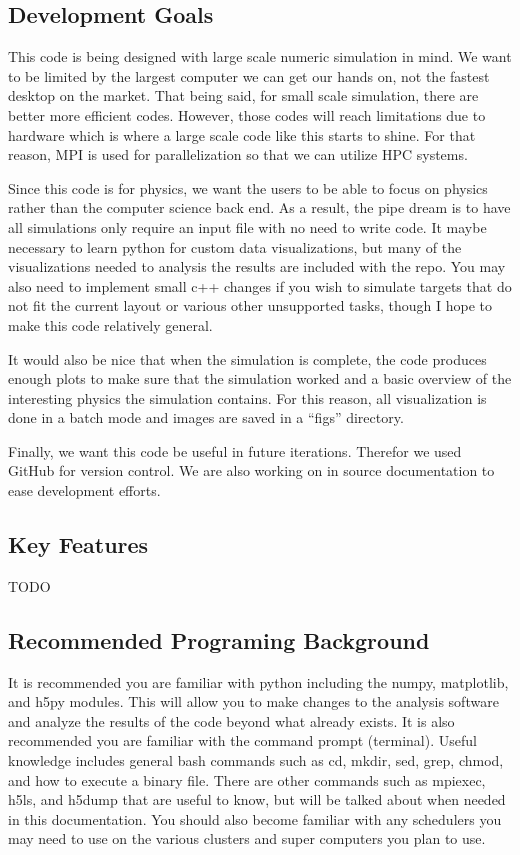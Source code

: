 \documentclass{article}
\begin{document}
\subsection{Development Goals} %
\label{sub:development_goals}
This code is being designed with large scale numeric simulation in mind. We want to be limited by the largest computer we can get our hands on, not the fastest desktop on the market. That being said, for small scale simulation, there are better more efficient codes. However, those codes will reach limitations due to hardware which is where a large scale code like this starts to shine. For that reason, MPI is used for parallelization so that we can utilize HPC systems.

Since this code is for physics, we want the users to be able to focus on physics rather than the computer science back end. As a result, the pipe dream is to have all simulations only require an input file with no need to write code. It maybe necessary to learn python for custom data visualizations, but many of the visualizations needed to analysis the results are included with the repo. You may also need to implement small c++ changes if you wish to simulate targets that do not fit the current layout or various other unsupported tasks, though I hope to make this code relatively general.

It would also be nice that when the simulation is complete, the code produces enough plots to make sure that the simulation worked and a basic overview of the interesting physics the simulation contains. For this reason, all visualization is done in a batch mode and images are saved in a ``figs'' directory.

Finally, we want this code be useful in future iterations. Therefor we used GitHub for version control. We are also working on in source documentation to ease development efforts.

\subsection{Key Features} %
\label{sub:key_features}
TODO

\subsection{Recommended Programing Background} %
\label{sub:recommended_programing_background}
It is recommended you are familiar with python including the numpy, matplotlib, and h5py modules. This will allow you to make changes to the analysis software and analyze the results of the code beyond what already exists. It is also recommended you are familiar with the command prompt (terminal). Useful knowledge includes general bash commands such as cd, mkdir, sed, grep, chmod, and how to execute a binary file. There are other commands such as mpiexec, h5ls, and h5dump that are useful to know, but will be talked about when needed in this documentation. You should also become familiar with any schedulers you may need to use on the various clusters and super computers you plan to use.
\end{document}
